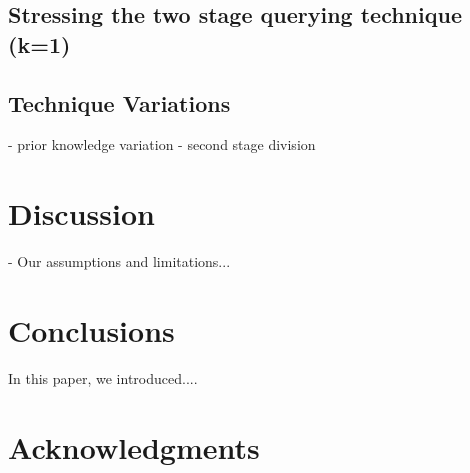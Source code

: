 \documentclass{acm_proc_article-sp}
\begin{document}
\subsection{Stressing the two stage querying technique (k=1)}
\subsection{Technique Variations}
- prior knowledge variation
- second stage division
\section{Discussion}
- Our assumptions and limitations...

\section{Conclusions}
In this paper, we introduced.... 

\section{Acknowledgments}


{\footnotesize
}  %
%
%
\end{document}
